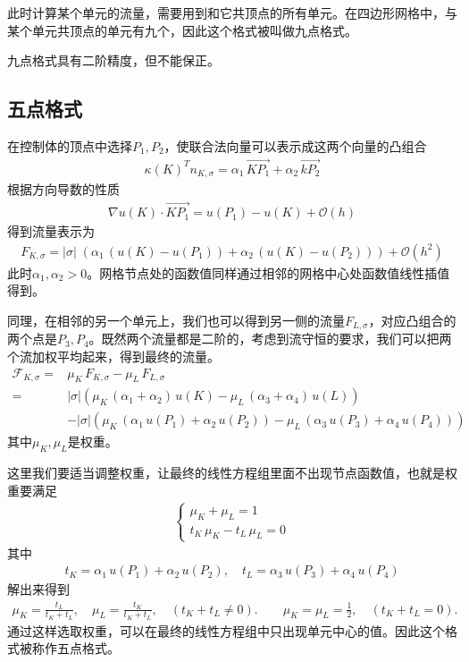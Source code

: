 \documentclass[12pt,a4paper]{article}
\theoremstyle{definition}
\begin{document}
此时计算某个单元的流量，需要用到和它共顶点的所有单元。在四边形网格中，与某个单元共顶点的单元有九个，因此这个格式被叫做九点格式。

九点格式具有二阶精度，但不能保正。

\subsection{五点格式}

在控制体的顶点中选择$P_1, P_2$，使联合法向量可以表示成这两个向量的凸组合
\begin{align*}
\kappa(K)^T n_{K, \sigma} = \alpha_1 \, \overrightarrow{K P_1} + \alpha_2 \, \overrightarrow{k P_2}
\end{align*}
根据方向导数的性质
\begin{align*}
\nabla u(K) \cdot \overrightarrow{K P_1} = u(P_1) - u(K) + \mathcal{O}(h)
\end{align*}
得到流量表示为
\begin{align*}
F_{K, \sigma} = |\sigma| \; (\alpha_1 \, (u(K) - u(P_1)) + \alpha_2 \, (u(K) - u(P_2))) + \mathcal{O}(h^2)
\end{align*}
此时$\alpha_1,\alpha_2 > 0$。网格节点处的函数值同样通过相邻的网格中心处函数值线性插值得到。

同理，在相邻的另一个单元上，我们也可以得到另一侧的流量$F_{L, \sigma}$，对应凸组合的两个点是$P_3, P_4$。既然两个流量都是二阶的，考虑到流守恒的要求，我们可以把两个流加权平均起来，得到最终的流量。
\begin{align*}
\mathcal{F}_{K, \sigma} = & \mu_K \, F_{K, \sigma} - \mu_L \, F_{L, \sigma} \\
= & |\sigma| \left(\mu_K \, (\alpha_1 + \alpha_2) \, u(K) - \mu_L \, (\alpha_3 + \alpha_4) \, u(L) \right) \\
& - |\sigma| \left(\mu_K \, (\alpha_1 \, u(P_1) + \alpha_2 \, u(P_2)) - \mu_L \, (\alpha_3 \, u(P_3) + \alpha_4 \, u(P_4)) \right)
\end{align*}
其中$\mu_K, \mu_L$是权重。

这里我们要适当调整权重，让最终的线性方程组里面不出现节点函数值，也就是权重要满足
\begin{align*}
\left\{
\begin{array}{l}
\mu_K + \mu_L = 1 \\
t_K \, \mu_K - t_L \, \mu_L = 0
\end{array}
\right.
\end{align*}
其中
\begin{align*}
t_K = \alpha_1 \, u(P_1) + \alpha_2 \, u(P_2), \quad t_L = \alpha_3 \, u(P_3) + \alpha_4 \, u(P_4)
\end{align*}
解出来得到
\begin{align*}
\mu_K = \frac{t_L}{t_K + t_L}, \quad \mu_L = \frac{t_K}{t_K + t_L}, \quad (t_K + t_L \neq 0). \qquad \mu_K = \mu_L = \frac12, \quad (t_K + t_L = 0).
\end{align*}
通过这样选取权重，可以在最终的线性方程组中只出现单元中心的值。因此这个格式被称作五点格式。
\end{document}
